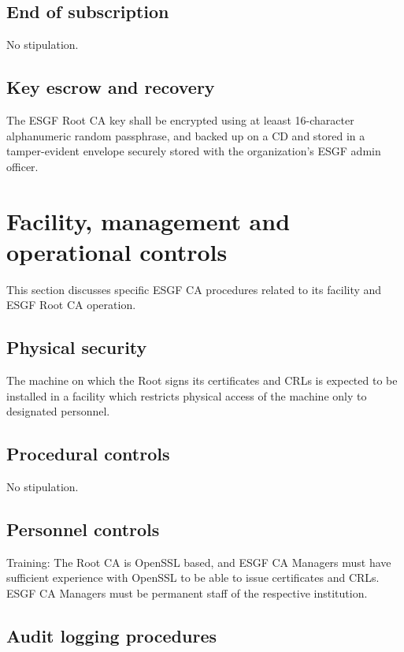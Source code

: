 \subsection{End of subscription}\label{end-of-subscription}

No stipulation.

\subsection{Key escrow and recovery}

The ESGF Root CA key shall be encrypted using at leaast 16-character alphanumeric random passphrase, and backed up on a CD and stored in a tamper-evident envelope securely stored with the organization's ESGF admin officer.

\section{Facility, management and operational controls}\label{facility-management-and-operational-controls}

This section discusses specific ESGF CA procedures related to its
facility and ESGF Root CA operation.

\subsection{Physical security}\label{physical-security-controls}

The machine on which the Root signs its certificates and CRLs is
expected to be installed in a facility which restricts physical access of the machine only to designated personnel.

\subsection{Procedural controls}
No stipulation.

\subsection{Personnel controls}\label{personnel-controls}

Training: The Root CA is OpenSSL based, and ESGF CA Managers must
have sufficient experience with OpenSSL to be able to issue certificates
and CRLs. ESGF CA Managers must be permanent staff of the respective institution.

\subsection{Audit logging procedures}\label{audit-logging-procedures}

